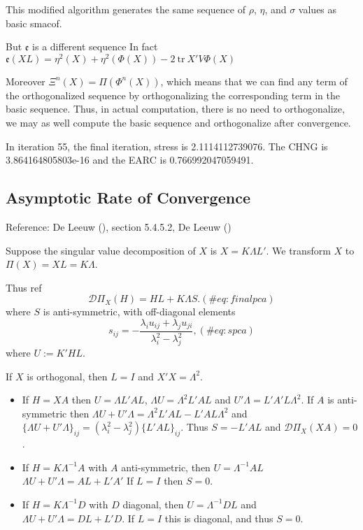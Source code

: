\documentclass[
  12pt,
  letterpaper,
  DIV=11,
  numbers=noendperiod]{scrartcl}
\begin{document}
This modified algorithm generates the same sequence of \(\rho\),
\(\eta\), and \(\sigma\) values as basic smacof.

But \(\mathfrak{e}\) is a different sequence In fact
\(\mathfrak{e}(XL)=\eta^2(X)+\eta^2(\Phi(X))-2\ \text{tr}\ X'V\Phi(X)\)

Moreover \(\Xi^n(X)=\Pi(\Phi^n(X))\), which means that we can find any
term of the orthogonalized sequence by orthogonalizing the corresponding
term in the basic sequence. Thus, in actual computation, there is no
need to orthogonalize, we may as well compute the basic sequence and
orthogonalize after convergence.

In iteration 55, the final iteration, stress is 2.1114112739076. The
CHNG is 3.864164805803e-16 and the EARC is 0.766992047059491.

\subsection{Asymptotic Rate of
Convergence}\label{asymptotic-rate-of-convergence-1}

Reference: De Leeuw (), section
5.4.5.2, De Leeuw ()

Suppose the singular value decomposition of \(X\) is \(X=K\Lambda L'\).
We transform \(X\) to \(\Pi(X)=XL=K\Lambda\).

Thus ref \begin{equation}
\mathcal{D}\Pi_X(H)=HL+K\Lambda S.
(\#eq:finalpca)
\end{equation} where \(S\) is anti-symmetric, with off-diagonal elements
\begin{equation}
s_{ij}=-\frac{\lambda_i u_{ij}+\lambda_j u_{ji}}{\lambda_i^2-\lambda_j^2},
(\#eq:spca)
\end{equation} where \(U:= K'HL\).

If \(X\) is orthogonal, then \(L=I\) and \(X'X=\Lambda^2\).

\begin{itemize}
\item
  If \(H=XA\) then \(U=\Lambda L'AL\), \(\Lambda U=\Lambda^2 L'AL\) and
  \(U'\Lambda=L'A'L\Lambda^2\). If \(A\) is anti-symmetric then
  \(\Lambda U+U'\Lambda=\Lambda^2 L'AL-L'AL\Lambda^2\) and
  \(\{\Lambda U+U'\Lambda\}_{ij}=(\lambda_i^2-\lambda_j^2)\{L'AL\}_{ij}\).
  Thus \(S=-L'AL\) and \(\mathcal{D}\Pi_X(XA)=0\).
\item
  If \(H=K\Lambda^{-1}A\) with \(A\) anti-symmetric, then
  \(U=\Lambda^{-1}AL\) \(\Lambda U+U'\Lambda=AL+L'A'\) If \(L=I\) then
  \(S=0\).
\item
  If \(H=K\Lambda^{-1}D\) with \(D\) diagonal, then \(U=\Lambda^{-1}DL\)
  and \(\Lambda U+U'\Lambda=DL+L'D\). If \(L=I\) this is diagonal, and
  thus \(S=0\).
\end{itemize}
\end{document}
